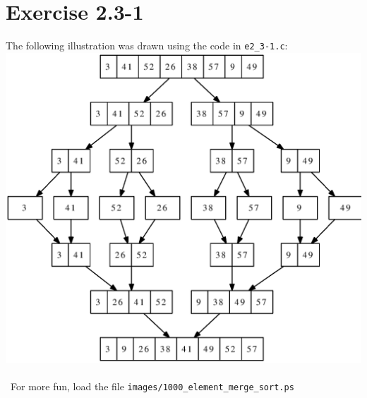 \documentclass{article}
\begin{document}
\section*{Exercise 2.3-1}

The following illustration was drawn using the code in \texttt{e2\_3-1.c}: \\
\protect\includegraphics[scale=0.5]{images/e2_3-1_merge_sort.ps}
\\ \\
\noindent~For more fun, load the file \texttt{images/1000\_element\_merge\_sort.ps}
\end{document}
